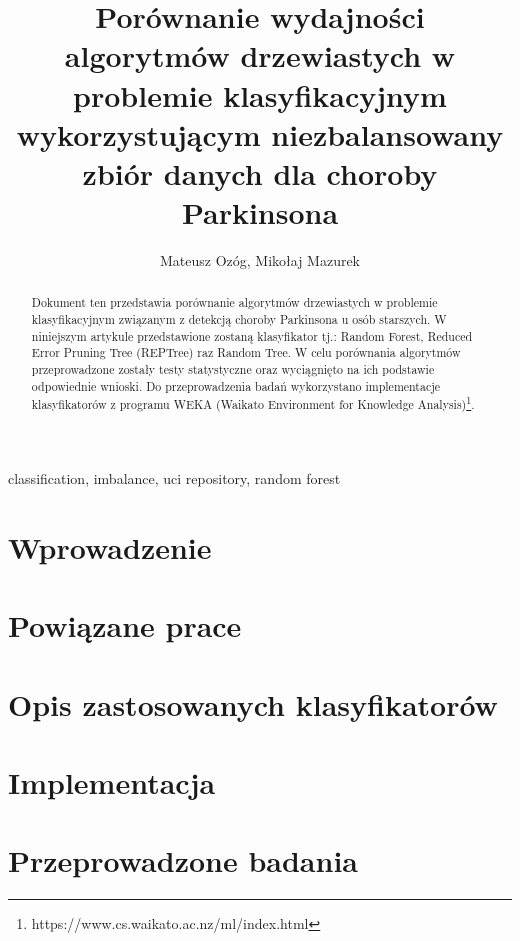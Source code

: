 \documentclass[conference]{IEEEtran}
\begin{document}
\title{Porównanie wydajności algorytmów drzewiastych w problemie klasyfikacyjnym wykorzystującym niezbalansowany zbiór danych dla choroby Parkinsona}

\author{Mateusz Ozóg, Mikołaj Mazurek}

\maketitle

\begin{abstract}
Dokument ten przedstawia porównanie algorytmów drzewiastych w problemie klasyfikacyjnym związanym z detekcją choroby Parkinsona u osób starszych. W niniejszym artykule przedstawione zostaną klasyfikator tj.: Random Forest, Reduced Error Pruning Tree (REPTree) raz Random Tree. W celu porównania algorytmów przeprowadzone zostały testy statystyczne oraz wyciągnięto na ich podstawie odpowiednie wnioski. Do przeprowadzenia badań wykorzystano implementacje klasyfikatorów z programu WEKA (Waikato Environment for Knowledge Analysis)\footnote{https://www.cs.waikato.ac.nz/ml/index.html}.
\end{abstract}

\begin{IEEEkeywords}
classification, imbalance, uci repository, random forest
\end{IEEEkeywords}

\section{Wprowadzenie}


\section{Powiązane prace}

\section{Opis zastosowanych klasyfikatorów}

\section{Implementacja}

\section{Przeprowadzone badania}
\end{document}
